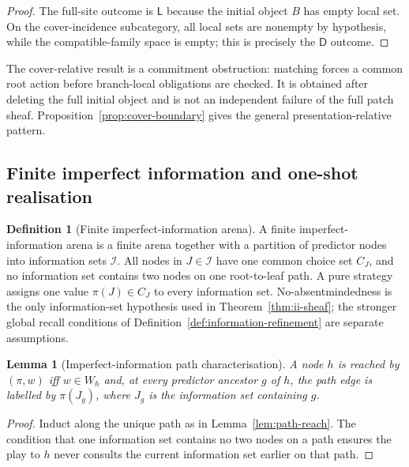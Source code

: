 \documentclass[11pt]{article}
\theoremstyle{plain}
\newtheorem{lemma}[theorem]{Lemma}
\theoremstyle{definition}
\newtheorem{definition}[theorem]{Definition}
\theoremstyle{remark}
\begin{document}
\begin{proof}
The full-site outcome is $\mathsf L$ because the initial object $B$ has empty
local set. On the cover-incidence subcategory, all local sets are nonempty by
hypothesis, while the compatible-family space is empty; this is precisely the
$\mathsf D$ outcome.
\end{proof}

The cover-relative result is a commitment obstruction: matching forces a common
root action before branch-local obligations are checked. It is obtained after
deleting the full initial object and is not an independent failure of the full
patch sheaf. Proposition~\ref{prop:cover-boundary} gives the general
presentation-relative pattern.

\subsection{Finite imperfect information and one-shot realisation}
\label{subsec:oneshot}

\begin{definition}[Finite imperfect-information arena]\label{def:ii-arena}
A finite imperfect-information arena is a finite arena together with a partition
of predictor nodes into information sets $\mathcal I$. All nodes in
$J\in\mathcal I$ have one common choice set $C_J$, and no information set
contains two nodes on one root-to-leaf path. A pure strategy assigns one value
$\pi(J)\in C_J$ to every information set. No-absentmindedness is the only
information-set hypothesis used in Theorem~\ref{thm:ii-sheaf}; the stronger
global recall conditions of Definition~\ref{def:information-refinement} are
separate assumptions.
\end{definition}

\begin{lemma}[Imperfect-information path characterisation]\label{lem:ii-path}
A node $h$ is reached by $(\pi,w)$ iff $w\in W_h$ and, at every predictor
ancestor $g$ of $h$, the path edge is labelled by $\pi(J_g)$, where $J_g$ is
the information set containing $g$.
\end{lemma}

\begin{proof}
Induct along the unique path as in Lemma~\ref{lem:path-reach}. The condition that
one information set contains no two nodes on a path ensures the play to $h$ never
consults the current information set earlier on that path.
\end{proof}
\end{document}
